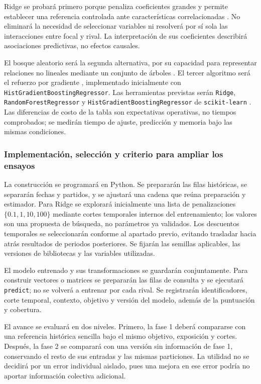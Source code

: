 Ridge se probará primero porque penaliza coeficientes grandes y permite establecer una referencia controlada ante características correlacionadas \cite{hoerl1970ridge}. No eliminará la necesidad de seleccionar variables ni resolverá por sí sola las interacciones entre focal y rival. La interpretación de sus coeficientes describirá asociaciones predictivas, no efectos causales.

El bosque aleatorio será la segunda alternativa, por su capacidad para representar relaciones no lineales mediante un conjunto de árboles \cite{breiman2001randomforests}. El tercer algoritmo será el refuerzo por gradiente \cite{friedman2001greedy}, implementado inicialmente con \texttt{HistGradient}\allowbreak\texttt{BoostingRegressor}. Las herramientas previstas serán \texttt{Ridge}, \texttt{RandomForest}\allowbreak\texttt{Regressor} y \texttt{HistGradient}\allowbreak\texttt{BoostingRegressor} de \texttt{scikit-learn} \cite{sklearnRidge616,sklearnRF616,sklearnHGB616}. Las diferencias de costo de la tabla son expectativas operativas, no tiempos comprobados; se medirán tiempo de ajuste, predicción y memoria bajo las mismas condiciones.

\subsubsection*{Implementación, selección y criterio para ampliar los ensayos}
La construcción se programará en Python. Se prepararán las filas históricas, se separarán fechas y partidos, y se ajustará una cadena que reúna preparación y estimador. Para Ridge se explorará inicialmente una lista de penalizaciones $\{0.1,1,10,100\}$ mediante cortes temporales internos del entrenamiento; los valores son una propuesta de búsqueda, no parámetros ya validados. Los descuentos temporales se seleccionarán conforme al apartado previo, evitando trasladar hacia atrás resultados de periodos posteriores. Se fijarán las semillas aplicables, las versiones de bibliotecas y las variables utilizadas.

El modelo entrenado y sus transformaciones se guardarán conjuntamente. Para construir vectores o matrices se prepararán las filas de consulta y se ejecutará \texttt{predict}; no se volverá a entrenar por cada rival. Se registrarán identificadores, corte temporal, contexto, objetivo y versión del modelo, además de la puntuación y cobertura.

El avance se evaluará en dos niveles. Primero, la fase 1 deberá compararse con una referencia histórica sencilla bajo el mismo objetivo, exposición y cortes. Después, la fase 2 se comparará con una versión sin información de fase 1, conservando el resto de sus entradas y las mismas particiones. La utilidad no se decidirá por un error individual aislado, pues una mejora en ese error podría no aportar información colectiva adicional.

